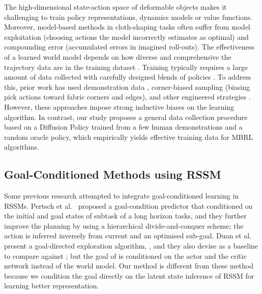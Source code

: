 \documentclass[journal]{IEEEtran}
\begin{document}
The high-dimensional state-action space of deformable objects makes it challenging to train policy representations, dynamics models or value functions. Moreover, model-based methods in cloth-shaping tasks often suffer from model exploitation (choosing actions the model incorrectly estimates as optimal) and compounding error (accumulated errors in imagined roll-outs). The effectiveness of a learned world model depends on how diverse and comprehensive the trajectory data are in the training dataset \cite{duan2024learning}. Training typically requires a large amount of data collected with carefully designed blends of policies \cite{hoque2022visuospatial, yan2021learning, ma2021learning, kadi2024planet}. To address this, prior work has used demonstration data \cite{matas2018sim,hoque2022visuospatial}, corner-biased sampling \cite{hoque2022visuospatial,weng2022fabricflownet} (biasing pick actions toward fabric corners and edges), and other engineered strategies \cite{arnold2023cloth,lin2022learning}. However, these approaches impose strong inductive biases on the learning algorithm. In contrast, our study proposes a general data collection procedure based on a Diffusion Policy \cite{chi2023diffusionpolicy} trained from a few human demonstrations and a random oracle policy, which empirically yields effective training data for MBRL algorithms.


\subsection{Goal-Conditioned Methods using RSSM}
Some previous research attempted to integrate goal-conditioned learning in RSSMs. Pertsch et al.~ \cite{pertsch2020long} proposed a goal-condition predictor  that conditioned on the initial and goal states of subtask of a long horizon tasks, and they further improve the planning by using a hierarchical divide-and-conquer scheme; the action is inferred inversely from current and an optimised sub-goal. Duan et al. ~\cite{duan2024learning} present a goal-directed exploration algorithm, , and they also devise  as a baseline to compare against ; but the goal of  is conditioned on the actor and the critic network instead of the world model. Our method is different from these method because we condition the goal directly on the latent state inference of RSSM for learning better representation.



\end{document}
